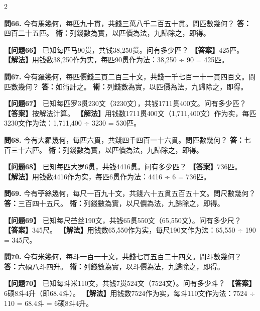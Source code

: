 \documentclass[11pt,a4paper]{article}
\begin{document}
\begin{paracol}{2}
\switchcolumn*

\textbf{問66.} 今有馬幾何，每匹九十貫，共錢三萬八千二百五十貫。問匹數幾何？\break
\textbf{答：}四百二十五匹。\break
\textbf{術：}列錢數為實，以匹價為法，九歸除之，即得。

\switchcolumn

\textbf{【问题66】} 已知每匹马90贯，共钱38,250贯。问有多少匹？\break
\textbf{【答案】}425匹。\break
\textbf{【解法】}用钱数38,250作为实，每匹90贯作为法：38,250 ÷ 90 = 425匹。

\switchcolumn*

\textbf{問67.} 今有羅幾何，每匹價錢三貫二百三十文，共錢一千七百一十一貫四百文。問匹數幾何？\break
\textbf{答：}如術計之。\break
\textbf{術：}列錢數為實，以匹價為法，九歸除之，即得。

\switchcolumn

\textbf{【问题67】} 已知每匹罗3贯230文（3230文），共钱1711贯400文。问有多少匹？\break
\textbf{【答案】}按解法计算。\break
\textbf{【解法】}用钱数1711贯400文（1,711,400文）作为实，每匹3230文作为法：1,711,400 ÷ 3230 = 530匹。

\switchcolumn*

\textbf{問68.} 今有大羅幾何，每匹六貫，共錢四千四百一十六貫。問匹數幾何？\break
\textbf{答：}七百三十六匹。\break
\textbf{術：}列錢數為實，以匹價為法，九歸除之，即得。

\switchcolumn

\textbf{【问题68】} 已知每匹大罗6贯，共钱4416贯。问有多少匹？\break
\textbf{【答案】}736匹。\break
\textbf{【解法】}用钱数4416作为实，每匹6贯作为法：4416 ÷ 6 = 736匹。

\switchcolumn*

\textbf{問69.} 今有苧絲幾何，每尺一百九十文，共錢六十五貫五百五十文。問尺數幾何？\break
\textbf{答：}三百四十五尺。\break
\textbf{術：}列錢數為實，以尺價為法，九歸除之，即得。

\switchcolumn

\textbf{【问题69】} 已知每尺苎丝190文，共钱65贯550文（65,550文）。问有多少尺？\break
\textbf{【答案】}345尺。\break
\textbf{【解法】}用钱数65,550作为实，每尺190文作为法：65,550 ÷ 190 = 345尺。

\switchcolumn*

\textbf{問70.} 今有米幾何，每斗一百一十文，共錢七貫五百二十四文。問斗數幾何？\break
\textbf{答：}六碩八斗四升。\break
\textbf{術：}列錢數為實，以斗價為法，九歸除之，即得。

\switchcolumn

\textbf{【问题70】} 已知每斗米110文，共钱7贯524文（7524文）。问有多少斗？\break
\textbf{【答案】}6硕8斗4升（即68.4斗）。\break
\textbf{【解法】}用钱数7524作为实，每斗110文作为法：7524 ÷ 110 = 68.4斗 = 6硕8斗4升。


\end{paracol}
\end{document}
